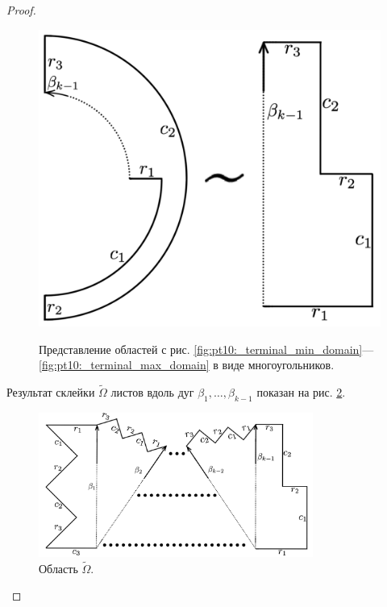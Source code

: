 \begin{proof}
\begin{figure}[!htb]
\caption{}
    \label{fig:pt10:_branching_domain_transformed}
\endminipage\hfill
{}
\centering
\includegraphics[scale=0.1]{images/ch4/section3_circular/atoms/branching/terminal_max_transformed.pdf}
\caption{}
    \label{fig:pt10:_terminal_max_domain_transformed}
\endminipage\hfill

\medskip


\centering
Представление областей с рис. \ref{fig:pt10:_terminal_min_domain}---\ref{fig:pt10:_terminal_max_domain} в виде многоугольников.
\end{figure}

Результат склейки $\widetilde{\Omega}$ листов вдоль дуг $\beta_1, \ldots, \beta_{k-1}$ показан на рис.    \ref{fig:pt10:_big_domain_transformed}.
\begin{figure}[!htb]
\centering
\includegraphics[width=9cm]{images/ch4/section3_circular/atoms/branching/big_domain_transformed.pdf}
    \caption{Область $\widetilde{\Omega}$.}
    \label{fig:pt10:_big_domain_transformed}
\end{figure}


\end{proof}
